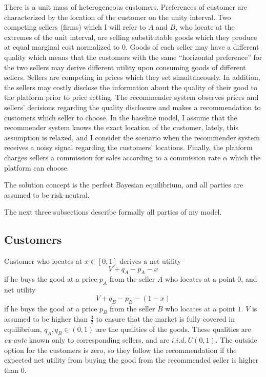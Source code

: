 \documentclass[a4paper]{article}
\begin{document}
	
There is a unit mass of heterogeneous customers. Preferences of customer are characterized by the location of the customer on the unity interval. Two competing sellers (firms) which I will refer to $A$ and $B$, who locate at the extremes of the unit interval, are selling substitutable goods which they produce at equal marginal cost normalized to 0. Goods of each seller may have a different quality which means that the customers with the same ``horizontal preference'' for the two sellers may derive different utility upon consuming goods of different sellers. Sellers are competing in prices which they set simultaneously. In addition, the sellers may costly disclose the information about the quality of their good to the platform prior to price setting. The recommender system observes prices and sellers' decisions regarding the quality disclosure and makes a recommendation to customers which seller to choose. In the baseline model, I assume that the recommender system knows the exact location of the customer, lately, this assumption is relaxed, and I consider the scenario when the recommender system receives a noisy signal regarding the customers' locations. Finally, the platform charges sellers a commission for sales according to a commission rate $\alpha$ which the platform can choose. 
	
	
The solution concept is the perfect Bayesian equilibrium, and all parties are assumed to be risk-neutral.



The next three subsections describe formally all parties of my model.

	
	
	
	
	
	\subsection{Customers}
Customer who locates at $x \in [0, 1]$ derives a net utility $$V + q_A - p_A - x$$ if  he buys the good at a price $p_A$ from the seller $A$ who locates at a point $0$, and net utility $$V + q_B - p_B - (1-x)$$ if  he buys the good at a price $p_B$ from the seller $B$ who locates at a point $1$. $V$ is assumed to be higher than $\frac{3}{2}$ to ensure that the market is fully covered in equilibrium, $q_A, q_B \in (0, 1)$ are the qualities of the goods. These qualities are \textit{ex-ante} known only to corresponding sellers, and are $i.i.d.\  U(0, 1)$. The outside option for the customers is zero, so they follow the recommendation if the expected net utility from buying the good from the recommended seller is higher than 0.
\end{document}

